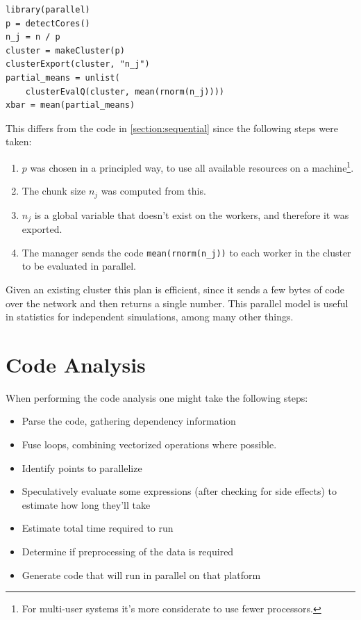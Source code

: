 \documentclass[12pt]{article}
\begin{document}
\begin{verbatim}
library(parallel)
p = detectCores()
n_j = n / p
cluster = makeCluster(p)
clusterExport(cluster, "n_j")
partial_means = unlist(
    clusterEvalQ(cluster, mean(rnorm(n_j))))
xbar = mean(partial_means)
\end{verbatim}

This differs from the code in \ref{section:sequential} since
the following steps were taken:
\begin{enumerate}
    \item $p$ was chosen in a principled way, to use all available
        resources on a machine\footnote{For multi-user systems it's more
        considerate to use fewer processors.}. 
    \item The chunk size $n_j$ was computed from this.
    \item $n_j$ is a global variable that doesn't exist on
        the workers, and therefore it was exported.
    \item The manager sends the code \texttt{mean(rnorm(n\_j))} to each
        worker in the cluster to be evaluated in parallel. 
\end{enumerate}

Given an existing cluster this plan is efficient, since it
sends a few bytes of code over the network and then returns a single
number. This parallel model is useful in statistics for independent
simulations, among many other things.

\section{Code Analysis}

When performing the code analysis one might take the following steps:

\begin{itemize}
    \item Parse the code, gathering dependency information
    \item Fuse loops, combining vectorized operations where possible.
    \item Identify points to parallelize
    \item Speculatively evaluate some expressions (after checking for side
        effects) to estimate how long they'll
        take
    \item Estimate total time required to run
    \item Determine if preprocessing of the data is required
    \item Generate code that will run in parallel on that platform
\end{itemize}
\end{document}
